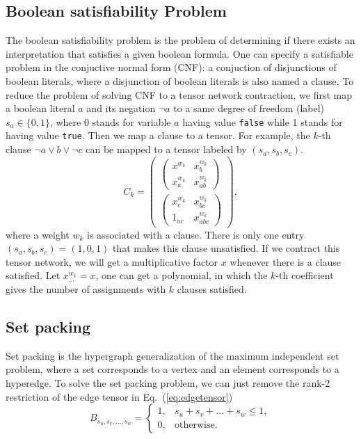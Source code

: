 \documentclass[onefignum, onetabnum]{siamart190516}
\newcommand{\<}{\langle}
\renewcommand{\>}{\rangle}
\newcommand{\Eq}[1]{Eq.~(\ref{#1})}
\newcounter{example}
\begin{document}
\subsection{Boolean satisfiability Problem}
The boolean satisfiability problem is the problem of determining if there exists an interpretation that satisfies a given boolean formula.
One can specify a satisfiable problem in the conjuctive normal form (CNF): a conjuction of disjunctions of boolean literals,
where a disjunction of boolean literals is also named a clause.
To reduce the problem of solving CNF to a tensor network contraction, we first map a boolean literal $a$ and its negation $\neg a$ to a same degree of freedom (label) $s_a \in \{0, 1\}$,
where 0 stands for variable $a$ having value \texttt{false} while 1 stands for having value \texttt{true}.
Then we map a clause to a tensor. For example, the $k$-th clause $\neg a \vee b \vee \neg c$ can be mapped to a tensor labeled by $(s_a, s_b, s_c)$.
\begin{equation}
C_{k} = \left(\begin{matrix}
\left(\begin{matrix}
x^{w_k} & x_{b}^{w_k} \\
x_a^{w_k} & x_{ab}^{w_k}
\end{matrix}\right) \\
\left(\begin{matrix}
x_{c}^{w_k} & x_{bc}^{w_k} \\
1_{ac} & x_{abc}^{w_k}
\end{matrix}\right)
\end{matrix}\right),
\end{equation}
where a weight $w_k$ is associated with a clause. There is only one entry $(s_a, s_b, s_c) = (1, 0, 1)$ that makes this clause unsatisfied.
If we contract this tensor network, we will get a multiplicative factor $x$ whenever there is a clause satisfied.
Let $x^{w_k}_{\ldots} = x$, one can get a polynomial, in which the $k$-th coefficient gives the number of assignments with $k$ clauses satisfied.

\subsection{Set packing}
Set packing is the hypergraph generalization of the maximum independent set problem, where a set corresponds to a vertex and an element corresponds to a hyperedge.
To solve the set packing problem, we can just remove the rank-2 restriction of the edge tensor in \Eq{eq:edgetensor}
\begin{equation}
    B_{s_u,s_v,\ldots, s_w} = \begin{cases}
        1, & s_u+s_v+\ldots+s_w\leq 1,\\
        0, & \text{otherwise}.
    \end{cases}
\end{equation}
\end{document}
